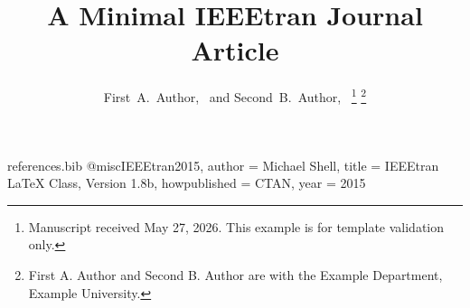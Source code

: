 \begin{filecontents*}{references.bib}
@misc{IEEEtran2015,
  author       = {Michael Shell},
  title        = {{IEEEtran} LaTeX Class, Version 1.8b},
  howpublished = {CTAN},
  year         = {2015}
}
\end{filecontents*}

\documentclass[journal]{IEEEtran}

\usepackage{cite}
\usepackage{graphicx}



\title{A Minimal IEEEtran Journal Article}

\author{First~A.~Author,~
        and Second~B.~Author,~%
\thanks{Manuscript received May 27, 2026. This example is for template validation only.}%
\thanks{First A. Author and Second B. Author are with the Example Department, Example University.}}

%
{Author \MakeLowercase{\textit{et al.}}: A Minimal IEEEtran Journal Article}

\maketitle

\begin{abstract}
This minimal example demonstrates the structure of an IEEEtran journal article using BibTeX and the IEEEtran bibliography style.
\end{abstract}

\begin{IEEEkeywords}
IEEEtran, LaTeX, template.
\end{IEEEkeywords}

\section{Introduction}

This source uses the IEEEtran class and cites the IEEEtran package record \cite{IEEEtran2015}.

\section{Method}

Manuscript content should be converted without changing scientific claims.

\section{Conclusion}


